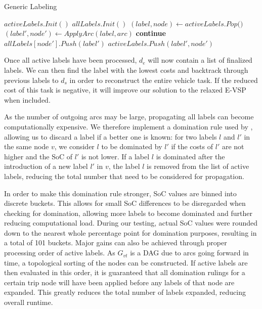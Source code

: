 \documentclass[]{article}
\begin{document}
\begin{algorithm}
\caption{Generic Labeling}\label{alg:evsp-labeling}
\begin{algorithmic}
\State $activeLabels.Init()$ 
\State $allLabels.Init()$ 
    \State $(label, node) \gets \textit{activeLabels.Pop()}$
        \State $(label', node') \gets ApplyArc(label, arc)$
          \textbf{continue}
        \EndIf
        \State $allLabels[node'].Push(label')$
          \State $activeLabels.Push(label', node')$
        \EndIf
    \EndFor
\EndWhile
\end{algorithmic}
\end{algorithm}
Once all active labels have been processed, $d_e$ will now contain a list of finalized labels. We can then find the label with the lowest costs and backtrack through previous labels to $d_s$ in order to reconstruct the entire vehicle task. If the reduced cost of this task is negative, it will improve our solution to the relaxed E-VSP when included. 

As the number of outgoing arcs may be large, propagating all labels can become computationally expensive. We therefore implement a domination rule used by \citet{Huang2016}, allowing us to discard a label if a better one is known: for two labels $l$ and $l'$ in the same node $v$, we consider $l$ to be dominated by $l'$ if the costs of $l'$ are not higher and the SoC of $l'$ is not lower. If a label $l$ is dominated after the introduction of a new label $l'$ in $v$, the label $l$ is removed from the list of active labels, reducing the total number that need to be considered for propagation.

In order to make this domination rule stronger, SoC values are binned into discrete buckets. This allows for small SoC differences to be disregarded when checking for domination, allowing more labels to become dominated and further reducing computational load. During our testing, actual SoC values were rounded down to the nearest whole percentage point for domination purposes, resulting in a total of 101 buckets. Major gains can also be achieved through proper processing order of active labels. As $G_{vt}$ is a DAG due to arcs going forward in time, a topological sorting of the nodes can be constructed. If active labels are then evaluated in this order, it is guaranteed that all domination rulings for a certain trip node will have been applied before any labels of that node are expanded. This greatly reduces the total number of labels expanded, reducing overall runtime.
\end{document}
